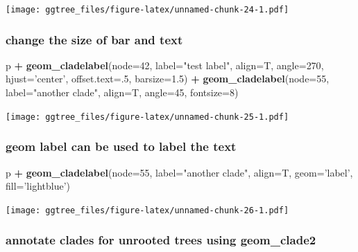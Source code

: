 \documentclass[]{article}
\newenvironment{Shaded}{\begin{snugshade}}{\end{snugshade}}
\newcommand{\KeywordTok}[1]{\textcolor[rgb]{0.13,0.29,0.53}{\textbf{#1}}}
\newcommand{\DataTypeTok}[1]{\textcolor[rgb]{0.13,0.29,0.53}{#1}}
\newcommand{\DecValTok}[1]{\textcolor[rgb]{0.00,0.00,0.81}{#1}}
\newcommand{\FloatTok}[1]{\textcolor[rgb]{0.00,0.00,0.81}{#1}}
\newcommand{\StringTok}[1]{\textcolor[rgb]{0.31,0.60,0.02}{#1}}
\newcommand{\OperatorTok}[1]{\textcolor[rgb]{0.81,0.36,0.00}{\textbf{#1}}}
\newcommand{\NormalTok}[1]{#1}
\begin{document}
\texttt{[image: ggtree\_files/figure-latex/unnamed-chunk-24-1.pdf]}

\subsubsection{change the size of bar and
text}\label{change-the-size-of-bar-and-text}

\begin{Shaded}
\begin{Highlighting}[]
\NormalTok{p }\OperatorTok{+}\StringTok{ }\KeywordTok{geom_cladelabel}\NormalTok{(}\DataTypeTok{node=}\DecValTok{42}\NormalTok{, }\DataTypeTok{label=}\StringTok{"test label"}\NormalTok{, }\DataTypeTok{align=}\NormalTok{T, }\DataTypeTok{angle=}\DecValTok{270}\NormalTok{, }\DataTypeTok{hjust=}\StringTok{'center'}\NormalTok{, }\DataTypeTok{offset.text=}\NormalTok{.}\DecValTok{5}\NormalTok{, }\DataTypeTok{barsize=}\FloatTok{1.5}\NormalTok{) }\OperatorTok{+}
\StringTok{  }\KeywordTok{geom_cladelabel}\NormalTok{(}\DataTypeTok{node=}\DecValTok{55}\NormalTok{, }\DataTypeTok{label=}\StringTok{"another clade"}\NormalTok{, }\DataTypeTok{align=}\NormalTok{T, }\DataTypeTok{angle=}\DecValTok{45}\NormalTok{, }\DataTypeTok{fontsize=}\DecValTok{8}\NormalTok{)}
\end{Highlighting}
\end{Shaded}

\texttt{[image: ggtree\_files/figure-latex/unnamed-chunk-25-1.pdf]}

\subsubsection{geom label can be used to label the
text}\label{geom-label-can-be-used-to-label-the-text}

\begin{Shaded}
\begin{Highlighting}[]
\NormalTok{p }\OperatorTok{+}\StringTok{ }\KeywordTok{geom_cladelabel}\NormalTok{(}\DataTypeTok{node=}\DecValTok{55}\NormalTok{, }\DataTypeTok{label=}\StringTok{"another clade"}\NormalTok{, }\DataTypeTok{align=}\NormalTok{T, }\DataTypeTok{geom=}\StringTok{'label'}\NormalTok{, }\DataTypeTok{fill=}\StringTok{'lightblue'}\NormalTok{)}
\end{Highlighting}
\end{Shaded}

\texttt{[image: ggtree\_files/figure-latex/unnamed-chunk-26-1.pdf]}

\subsubsection{annotate clades for unrooted trees using
geom\_clade2}\label{annotate-clades-for-unrooted-trees-using-geom_clade2}
\end{document}
